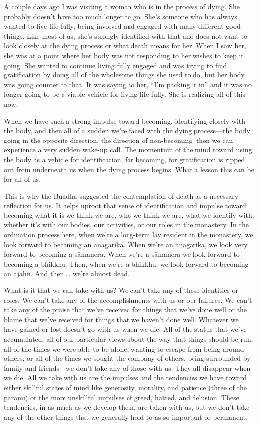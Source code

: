 A couple days ago I was visiting a woman who is in the process of 
dying. She probably doesn't have too much longer to go. She's someone 
who has always wanted to live life fully, being involved and engaged 
with many different good things. Like most of us, she's strongly 
identified with that and does not want to look closely at the dying 
process or what death means for her. When I saw her, she was at a point 
where her body was not responding to her wishes to keep it going. She 
wanted to continue living fully engaged and was trying to find 
gratification by doing all of the wholesome things she used to do, but 
her body was going counter to that. It was saying to her, ``I'm packing 
it in'' and it was no longer going to be a viable vehicle for living 
life fully. She is realizing all of this now.

When we have such a strong impulse toward becoming, identifying closely 
with the body, and then all of a sudden we're faced with the dying 
process---the body going in the opposite direction, the direction of 
non-becoming, then we can experience a very sudden wake-up call. The 
momentum of the mind toward using the body as a vehicle for 
identification, for becoming, for gratification is ripped out from 
underneath us when the dying process begins. What a lesson this can be 
for all of us.

This is why the Buddha suggested the contemplation of death as a 
necessary reflection for us. It helps uproot that sense of 
identification and impulse toward becoming what it is we think we are, 
who we think we are, what we identify with, whether it's with our 
bodies, our activities, or our roles in the monastery. In the 
ordination process here, when we're a long-term lay resident in the 
monastery, we look forward to becoming an anagārika. When we're an 
anagārika, we look very forward to becoming a sāmaṇera. When we're 
a sāmaṇera we look forward to becoming a bhikkhu. Then, when we're a 
bhikkhu, we look forward to becoming an ajahn. And then \ldots{} we're 
almost dead.

What is it that we can take with us? We can't take any of those 
identities or roles. We can't take any of the accomplishments with us 
or our failures. We can't take any of the praise that we've received 
for things that we've done well or the blame that we've received for 
things that we haven't done well. Whatever we have gained or lost 
doesn't go with us when we die. All of the status that we've 
accumulated, all of our particular views about the way that things 
should be run, all of the times we were able to be alone, wanting to 
escape from being around others, or all of the times we sought the 
company of others, being surrounded by family and friends---we don't 
take any of those with us. They all disappear when we die. All we take 
with us are the impulses and the tendencies we have toward either 
skillful states of mind like generosity, morality, and patience (three 
of the pāramī) or the more unskillful impulses of greed, hatred, and 
delusion. These tendencies, in as much as we develop them, are taken 
with us, but we don't take any of the other things that we generally 
hold to as so important or permanent.

